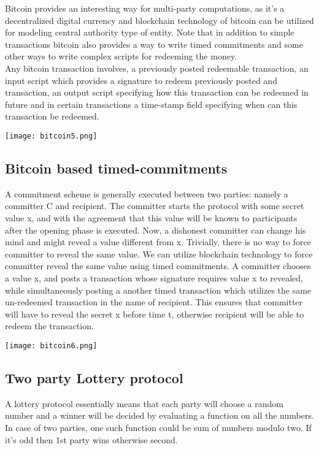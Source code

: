 \documentclass[a4paper]{article}
\begin{document}
Bitcoin provides an interesting way for multi-party computations, as it's a decentralized digital currency and blockchain technology of bitcoin can be utilized for modeling central authority type of entity. Note that in addition to simple transactions bitcoin also provides a way to write timed commitments and some other ways to write complex scripts for redeeming the money.\\ 
Any bitcoin transaction involves, a previously posted redeemable transaction, an input script which provides a signature to redeem previously posted and transaction, an output script specifying how this transaction can be redeemed in future and in certain transactions a time-stamp field specifying when can this transaction be redeemed.\\
\begin{center}
\texttt{[image: bitcoin5.png]}
\end{center}
\subsection{Bitcoin based timed-commitments}
A commitment scheme is generally executed between two parties: namely a committer C and recipient. The committer starts the protocol with some secret value x, and with the agreement that this value will be known to participants after the opening phase is executed. Now, a dishonest committer can change his mind and might reveal a value different from x. Trivially, there is no way to force committer to reveal the same value. We can utilize blockchain technology to force committer reveal the same value using timed commitments. A committer chooses a value x, and posts a transaction whose signature requires value x to revealed, while simultaneously posting a another timed transaction which utilizes the same un-redeemed transaction in the name of recipient. This ensures that committer will have to reveal the secret x before time t, otherwise recipient will be able to redeem the transaction.\\
\begin{center}
\texttt{[image: bitcoin6.png]}
\end{center}
\subsection{Two party Lottery protocol}
A lottery protocol essentially means that each party will choose a random number and a winner will be decided by evaluating a function on all the numbers. In case of two parties, one such function could be sum of numbers modulo two. If it's odd then 1st party wins otherwise second.
\end{document}

